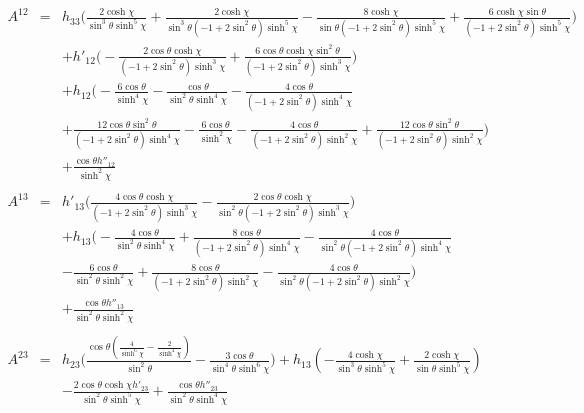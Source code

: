 \documentclass[10pt,letterpaper]{article}
\numberwithin{equation}{section}
\begin{document}
\begin{eqnarray}
\\  \nonumber\\ 
A^{12}&=& h_{33} \bigl(\frac{2 \cosh\chi}{\sin^3\theta \sinh^5\chi} + \frac{2 \cosh\chi}{\sin^3\theta (-1 + 2 \sin^2\theta) \sinh^5\chi} -  \frac{8 \cosh\chi}{\sin\theta (-1 + 2 \sin^2\theta) \sinh^5\chi} + \frac{6 \cosh\chi \sin\theta}{(-1 + 2 \sin^2\theta) \sinh^5\chi}\bigr) \nonumber \\ 
&& + h'_{12} \bigl(- \frac{2 \cos\theta \cosh\chi}{(-1 + 2 \sin^2\theta) \sinh^3\chi} + \frac{6 \cos\theta \cosh\chi \sin^2\theta}{(-1 + 2 \sin^2\theta) \sinh^3\chi}\bigr) \nonumber \\ 
&& + h_{12} \bigl(- \frac{6 \cos\theta}{\sinh^4\chi} -  \frac{\cos\theta}{\sin^2\theta \sinh^4\chi} -  \frac{4 \cos\theta}{(-1 + 2 \sin^2\theta) \sinh^4\chi} \nonumber\\
&& + \frac{12 \cos\theta \sin^2\theta}{(-1 + 2 \sin^2\theta) \sinh^4\chi} -  \frac{6 \cos\theta}{\sinh^2\chi} -  \frac{4 \cos\theta}{(-1 + 2 \sin^2\theta) \sinh^2\chi} + \frac{12 \cos\theta \sin^2\theta}{(-1 + 2 \sin^2\theta) \sinh^2\chi}\bigr) \nonumber \\ 
&& + \frac{\cos\theta h''_{12}}{\sinh^2\chi}
\\  \nonumber\\ 
A^{13}&=& h'_{13} \bigl(\frac{4 \cos\theta \cosh\chi}{(-1 + 2 \sin^2\theta) \sinh^3\chi} -  \frac{2 \cos\theta \cosh\chi}{\sin^2\theta (-1 + 2 \sin^2\theta) \sinh^3\chi}\bigr) \nonumber \\ 
&& + h_{13} \bigl(- \frac{4 \cos\theta}{\sin^2\theta \sinh^4\chi} + \frac{8 \cos\theta}{(-1 + 2 \sin^2\theta) \sinh^4\chi} -  \frac{4 \cos\theta}{\sin^2\theta (-1 + 2 \sin^2\theta) \sinh^4\chi} \nonumber\\
&& -  \frac{6 \cos\theta}{\sin^2\theta \sinh^2\chi} + \frac{8 \cos\theta}{(-1 + 2 \sin^2\theta) \sinh^2\chi} -  \frac{4 \cos\theta}{\sin^2\theta (-1 + 2 \sin^2\theta) \sinh^2\chi}\bigr) \nonumber \\ 
&& + \frac{\cos\theta h''_{13}}{\sin^2\theta \sinh^2\chi}
\\  \nonumber\\ 
A^{23}&=& h_{23} \bigl(\frac{\cos\theta (\frac{4}{\sinh^6\chi} -  \frac{2}{\sinh^4\chi})}{\sin^2\theta} -  \frac{3 \cos\theta}{\sin^4\theta \sinh^6\chi}\bigr) + h_{13} (- \frac{4 \cosh\chi}{\sin^3\theta \sinh^5\chi} + \frac{2 \cosh\chi}{\sin\theta \sinh^5\chi}) \nonumber \\ 
&& -  \frac{2 \cos\theta \cosh\chi h'_{23}}{\sin^2\theta \sinh^5\chi} + \frac{\cos\theta h''_{23}}{\sin^2\theta \sinh^4\chi}
\end{eqnarray}
\end{document}

